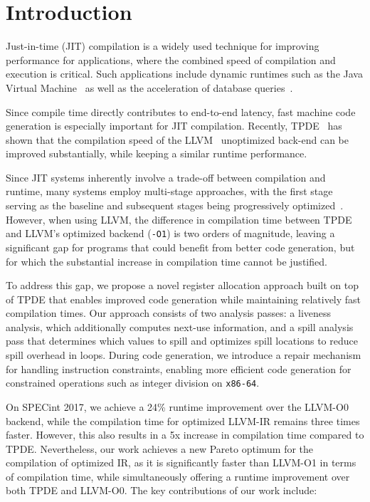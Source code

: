 
\chapter{Introduction}\label{chapter:introduction}

Just-in-time (JIT) compilation is a widely used technique for improving performance for applications, where the combined speed of compilation and execution is critical. Such
applications include dynamic runtimes such as the Java Virtual Machine~\cite{jvm} as well as
the acceleration of database queries~\cite{sql-jit}. 

Since compile time directly contributes to end-to-end latency, fast machine code generation is especially important for JIT compilation. Recently, TPDE~\cite{tpde} has shown that the compilation speed of the LLVM~\cite{LLVM} unoptimized back-end can be improved substantially, while keeping a similar runtime performance. 

Since JIT systems inherently involve a trade-off between compilation and runtime, many
systems employ multi-stage approaches, with the first stage serving as the baseline and subsequent stages being progressively optimized~\cite{tpde}.
However, when using LLVM, the difference in compilation time between TPDE and LLVM's optimized backend (\texttt{-O1}) is two orders of magnitude, leaving a significant gap for programs that could benefit from better code generation, but for which the substantial increase in compilation time cannot be justified.

To address this gap, we propose a novel register allocation approach built on top of TPDE that enables improved code generation while maintaining relatively fast compilation times. Our approach consists of two analysis passes: a liveness analysis, which additionally computes next-use information, and a spill analysis pass that determines which values to spill and optimizes spill locations to reduce spill overhead in loops. During code generation, we introduce a repair mechanism for handling instruction constraints, enabling more efficient code generation for constrained operations such as integer division on \texttt{x86-64}.

On SPECint 2017, we achieve a 24\% runtime improvement over the LLVM-O0 backend,
while the compilation time for optimized LLVM-IR remains three times faster. However,
this also results in a 5x increase in compilation time compared to TPDE. Nevertheless, our work achieves a
new Pareto optimum for the compilation of optimized IR, as it is significantly faster than LLVM-O1 in terms of compilation time,
while simultaneously offering a runtime improvement over both
TPDE and LLVM-O0.
\newpage
The key contributions of our work include:

